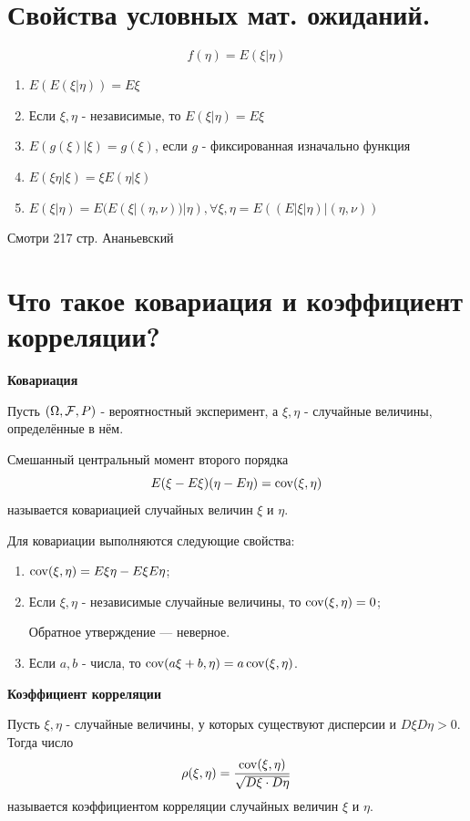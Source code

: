 \section{Свойства условных мат. ожиданий.}

\[f(\eta)=E(\xi|\eta)\]
\begin{enumerate}
	\item $E(E(\xi|\eta))=E\xi$
	\item Если $\xi, \eta$ - независимые, то $E(\xi|\eta)=E\xi$
	\item $E(g(\xi)|\xi)=g(\xi)$, если $g$ - фиксированная изначально функция
	\item $E(\xi\eta|\xi)=\xi E(\eta|\xi)$
	\item $E(\xi|\eta)=E(E(\xi|(\eta,\nu))|\eta), \forall \xi,\eta=E((E|\xi|\eta)|(\eta,\nu))$
\end{enumerate}

\begin{remark}
	Смотри 217 стр. Ананьевский
\end{remark}

\section{Что такое ковариация и коэффициент корреляции?}

\noindent \textbf{Ковариация}

Пусть $(\Omega, {\mathcal F}, P)$ - вероятностный эксперимент, а $\xi, \eta$ - случайные величины, определённые в нём.

\noindent Смешанный центральный момент второго порядка
\[ E (\xi - E\xi) (\eta - E\eta) = \operatorname{\mathop{cov}} (\xi, \eta) \]
называется ковариацией случайных величин $\xi$ и $\eta$.

Для ковариации выполняются следующие свойства:
\begin{enumerate}
	\item $\operatorname{\mathop{cov}} (\xi, \eta) = E \xi \eta - E \xi E \eta$;
	\item Если $\xi, \eta$ - независимые случайные величины, то $\operatorname{\mathop{cov}} (\xi, \eta) = 0$;
	
	Обратное утверждение — неверное.
	
	\item Если $a, b$ - числа, то $\operatorname{\mathop{cov}} (a \xi + b, \eta) = a \operatorname{\mathop{cov}} (\xi, \eta)$.
\end{enumerate}

\noindent \textbf{Коэффициент корреляции}

Пусть $\xi, \eta$ - случайные величины, у которых существуют дисперсии и $D\xi D\eta > 0$. Тогда число
\[ \rho (\xi, \eta) = \frac{\operatorname{\mathop{cov}} (\xi, \eta)}{\sqrt{D\xi \cdot D\eta}} \]
называется коэффициентом корреляции случайных величин $\xi$ и $\eta$.

